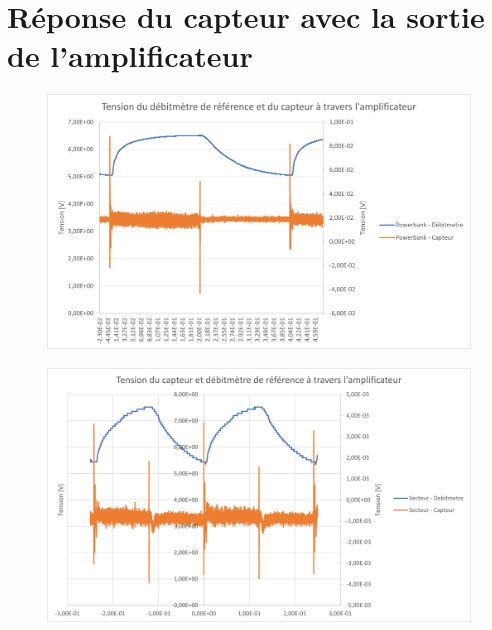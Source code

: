 \documentclass[
    iai & comatec, %
    mi, %
]{heig-tb}
\begin{document}
\section{Réponse du capteur avec la sortie de l'amplificateur}
\begin{figure}[H]
    \hspace{-1cm}
    \includegraphics[scale = 0.8]{assets/figures/Bruit_ampli1.png}
\end{figure}
\begin{figure}[H]
    \hspace{-1cm}
    \includegraphics[scale = 0.8]{assets/figures/Bruit_ampli2.png}
\end{figure}
\end{document}
